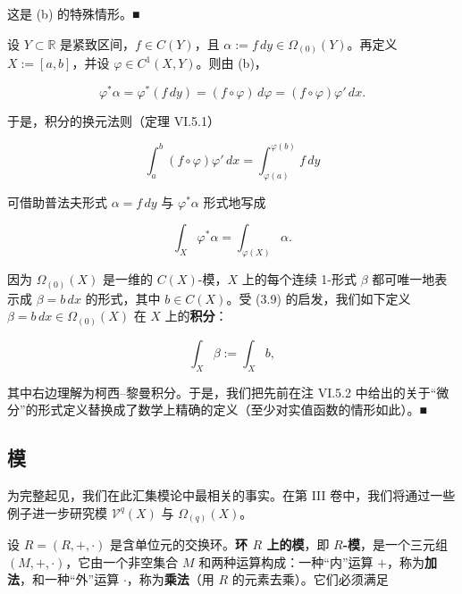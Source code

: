 \begin{example}
\begin{items}
\proofhead
这是 (b) 的特殊情形。\nobreak\hspace{0.35em}■
\item

设 $ Y \subset \mathbb{R} $ 是紧致区间，$ f \in C(Y) $，且 $ \alpha := f\,dy \in \Omega_{(0)}(Y) $。再定义 $ X := [a,b] $，并设 $ \varphi \in C^{1}(X,Y) $。则由 (b)，

\[
\varphi^{*}\alpha = \varphi^{*}(f\,dy) = (f\circ\varphi)\,d\varphi = (f\circ\varphi)\varphi'\,dx .
\]

于是，积分的换元法则（定理 VI.5.1）

\[
\int_{a}^{b}(f\circ\varphi)\varphi'\,dx = \int_{\varphi(a)}^{\varphi(b)}f\,dy
\]

可借助普法夫形式 $ \alpha = f\,dy $ 与 $ \varphi^{*}\alpha $ 形式地写成

\begin{equation}
\int_{X}\varphi^{*}\alpha = \int_{\varphi(X)}\alpha .\tag{3.9}
\end{equation}

因为 $ \Omega_{(0)}(X) $ 是一维的 $ C(X) $-模，$ X $ 上的每个连续 1-形式 $ \beta $ 都可唯一地表示成 $ \beta = b\,dx $ 的形式，其中 $ b \in C(X) $。受 (3.9) 的启发，我们如下定义 $ \beta = b\,dx \in \Omega_{(0)}(X) $ 在 $ X $ 上的\textbf{积分}：

\begin{equation}
\int_{X}\beta := \int_{X}b ,\tag{3.10}
\end{equation}

其中右边理解为柯西–黎曼积分。于是，我们把先前在注 VI.5.2 中给出的关于“微分”的形式定义替换成了数学上精确的定义（至少对实值函数的情形如此）。\nobreak\hspace{0.35em}■

\end{items}

\end{example}

\subsection*{模}

为完整起见，我们在此汇集模论中最相关的事实。在第 III 卷中，我们将通过一些例子进一步研究模 $ \mathcal{V}^{q}(X) $ 与 $ \Omega_{(q)}(X) $。

设 $ R = (R,+,\cdot) $ 是含单位元的交换环。\textbf{环 $ R $ 上的模}，即 \textbf{$ R $-模}，是一个三元组 $ (M,+,\cdot) $，它由一个非空集合 $ M $ 和两种运算构成：一种“内”运算 $ + $，称为\textbf{加法}，和一种“外”运算 $ \cdot $，称为\textbf{乘法}（用 $ R $ 的元素去乘）。它们必须满足

